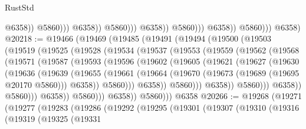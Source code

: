 \begin{lexlean}{RustStd}
\begin{coremodule}
                                              @6358))
                                          @5860)))
                                    @6358))
                                @5860)))
                          @6358))
                      @5860)))
                @6358))
            @5860)))
      @6358)
@20218 := @19466
    (@19469
      (@19485
        (@19491
          (@19494
            (@19500
              (@19503
                (@19519
                  (@19525
                    (@19528
                      (@19534
                        (@19537
                          (@19553
                            (@19559
                              (@19562
                                (@19568
                                  (@19571
                                    (@19587
                                      (@19593
                                        (@19596
                                          (@19602
                                            (@19605
                                              (@19621
                                                (@19627
                                                  (@19630
                                                    (@19636
                                                      (@19639
                                                        (@19655
                                                          (@19661
                                                            (@19664
                                                              (@19670
                                                                (@19673
                                                                  (@19689 (@19695 @20170 @5860)))
                                                                @6358))
                                                            @5860)))
                                                      @6358))
                                                  @5860)))
                                            @6358))
                                        @5860)))
                                  @6358))
                              @5860)))
                        @6358))
                    @5860)))
              @6358))
          @5860)))
    @6358
@20266 := @19268
    (@19271
      (@19277
        (@19283
          (@19286
            (@19292
              (@19295
                (@19301
                  (@19307
                    (@19310
                      (@19316
                        (@19319
                          (@19325
                            (@19331

\end{coremodule}
\end{lexlean}
